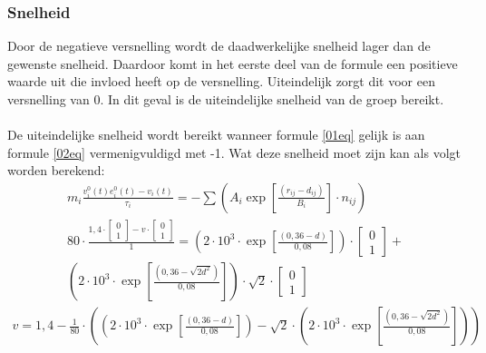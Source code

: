 \documentclass[12pt, letterpaper]{article}
\begin{document}
\subsubsection{Snelheid}
Door de negatieve versnelling wordt de daadwerkelijke snelheid lager dan de gewenste snelheid. Daardoor komt in het eerste deel van de formule een positieve waarde uit die invloed heeft op de versnelling. Uiteindelijk zorgt dit voor een versnelling van 0. In dit geval is de uiteindelijke snelheid van de groep bereikt.
\\ \\
De uiteindelijke snelheid wordt bereikt wanneer formule \ref{01eq} gelijk is aan formule \ref{02eq} vermenigvuldigd met -1. Wat deze snelheid moet zijn kan als volgt worden berekend:
\begin{equation}
\begin{gathered}
m_{i} \frac{v_{i}^{0}(t) e_{i}^{0}(t)-v_{i}(t)}{\tau_{i}}=-\sum\left(A_{i} \exp \left[\frac{\left(r_{i j}-d_{i j}\right)}{B_{i}}\right] \cdot n_{i j}\right) \\ 
80 \cdot \frac{1,4 \cdot\left[\begin{array}{l}
0 \\
1
\end{array}\right]-v \cdot\left[\begin{array}{l}
0 \\
1
\end{array}\right]}{1}=\left(2 \cdot 10^{3} \cdot \exp \left[\frac{(0,36-d)}{0,08}\right]\right) \cdot\left[\begin{array}{l}
0 \\
1
\end{array}\right]+ \\ \left(2 \cdot 10^{3} \cdot \exp \left[\frac{\left(0,36-\sqrt{2 d^{2}}\right)}{0,08}\right]\right) \cdot \sqrt{2} \cdot\left[\begin{array}{l}
0 \\
1
\end{array}\right]
\end{gathered}
\end{equation}
\begin{equation}
\begin{gathered}
v=1,4-\frac{1}{80} \cdot \left(\left(2 \cdot 10^{3} \cdot \exp \left[\frac{(0,36-d)}{0,08}\right]\right)-\sqrt{2} \cdot\left(2 \cdot 10^{3} \cdot \exp \left[\frac{\left(0,36-\sqrt{2 d^{2}}\right)}{0,08}\right]\right)\right)
\end{gathered}
\end{equation}
\end{document}
